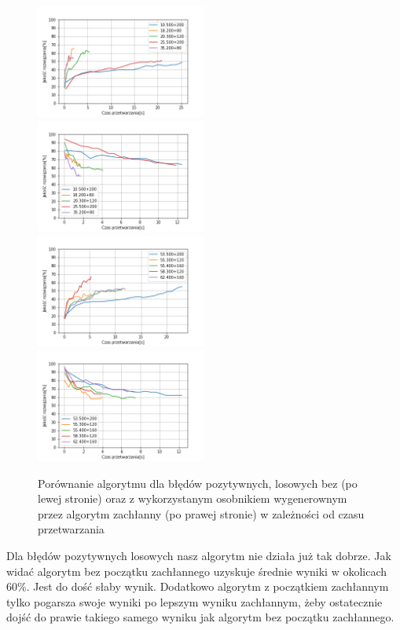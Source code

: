 \documentclass{article}
\begin{document}
\begin{figure}[H]
\includegraphics[width=0.5\textwidth]{Czaspoz-los1.png}
\includegraphics[width=0.5\textwidth]{Czaspoz-los-greedy1.png}
\includegraphics[width=0.5\textwidth]{Czaspoz-los2.png}
\includegraphics[width=0.5\textwidth]{Czaspoz-los-greedy2.png}
\caption{Porównanie algorytmu dla błędów pozytywnych, losowych bez (po lewej stronie) oraz z wykorzystanym osobnikiem wygenerownym przez algorytm zachłanny (po prawej stronie) w zależności od czasu przetwarzania}
\end{figure}
Dla błędów pozytywnych losowych nasz algorytm nie działa już tak dobrze. Jak widać algorytm bez początku zachłannego uzyskuje średnie wyniki w okolicach 60\%. Jest do dość słaby wynik. Dodatkowo algorytm z początkiem zachłannym tylko pogarsza swoje wyniki po lepszym wyniku zachłannym, żeby ostatecznie dojść do prawie takiego samego wyniku jak algorytm bez początku zachłannego.  
\end{document}
